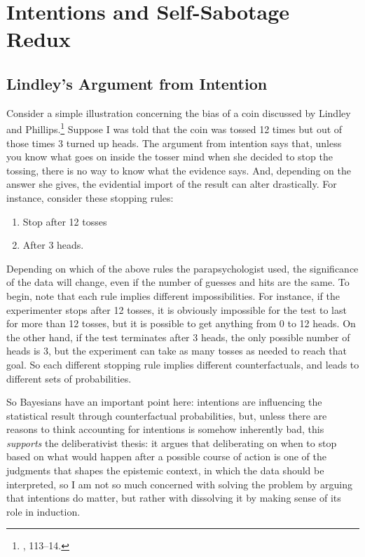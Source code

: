 \hypertarget{intentions-and-self-sabotage-redux}{%
\section{Intentions and Self-Sabotage
Redux}\label{sec:intentions-and-self-sabotage-redux}}
\subsection{Lindley's Argument from Intention}
Consider a simple illustration concerning the bias of a coin discussed
by Lindley and Phillips.\footnote{\cite{lindleybern}, 113--14.} Suppose I was told
that the coin was tossed 12 times but out of those times 3 turned up
heads. The argument from intention says that, unless you know what goes
on inside the tosser mind when she decided to stop the tossing, there is
no way to know what the evidence says. And, depending on the answer she
gives, the evidential import of the result can alter drastically. For
instance, consider these stopping rules:

\begin{enumerate}
\def\labelenumi{\arabic{enumi}.}
\tightlist
\item
  Stop after 12 tosses
\item
  After 3 heads.
\end{enumerate}

Depending on which of the above rules the
parapsychologist used, the significance of the data will change, even if
the number of guesses and hits are the same. To begin, note that each
rule implies different impossibilities. For instance, if the
experimenter stops after 12 tosses, it is obviously impossible for the
test to last for more than 12 tosses, but it is possible to get anything from 0 to 12 heads. On the other hand, if
the test terminates after 3 heads, the only possible number of heads is
3, but the experiment can take as many tosses as needed to reach that
goal. So each different stopping rule implies different counterfactuals,
and leads to different sets of probabilities.

So Bayesians have an important point here: intentions are influencing
the statistical result through counterfactual probabilities, but, unless
there are reasons to think accounting for intentions is somehow
inherently bad, this \emph{supports} the deliberativist thesis: it argues that deliberating on when to stop based on what would happen after a possible course of action is one of the judgments that shapes the epistemic context, in which the data should be interpreted, so I am not so much concerned with solving the problem by arguing that intentions do matter, but rather with dissolving it by making sense of its role in induction. 

